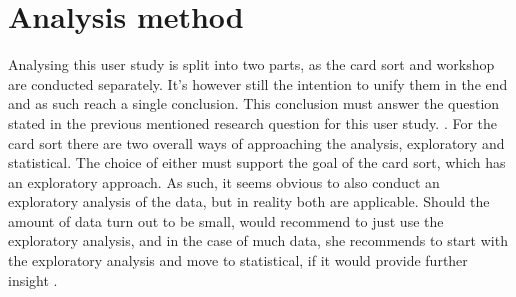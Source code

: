 \section{Analysis method}
\label{AnalysisMethod}
Analysing this user study is split into two parts, as the card sort and workshop are conducted separately. It's however still the intention to unify them in the end and as such reach a single conclusion. This conclusion must answer the question stated in the previous mentioned research question for this user study. . For the card sort there are two overall ways of approaching the analysis, exploratory and statistical. The choice of either must support the goal of the card sort, which has an exploratory approach. As such, it seems obvious to also conduct an exploratory analysis of the data, but in reality both are applicable. Should the amount of data turn out to be small, \textcite{WEB:DonnaSpencer} would recommend to just use the exploratory analysis, and in the case of much data, she recommends to start with the exploratory analysis and move to statistical, if it would provide further insight \parencite[][177]{WEB:DonnaSpencer}.

